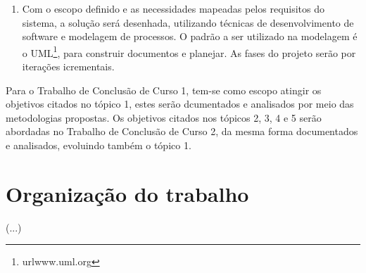 \begin{enumerate}
	\item{Com o escopo definido e as necessidades mapeadas pelos requisitos do sistema, a solução será desenhada, utilizando técnicas de desenvolvimento de software e modelagem de processos. O padrão a ser utilizado na modelagem é o UML\footnote{url{www.uml.org}}, para construir documentos e planejar. As fases do projeto serão por iterações icrementais.}

	\end{enumerate}

Para o Trabalho de Conclusão de Curso 1, tem-se como escopo atingir os objetivos citados no tópico 1, estes serão dcumentados e analisados por meio das metodologias propostas. Os objetivos citados nos tópicos 2, 3, 4 e 5 serão abordadas no Trabalho de Conclusão de Curso 2, da mesma forma documentados e analisados, evoluindo também o tópico 1.

\section{Organização do trabalho}
(...)





